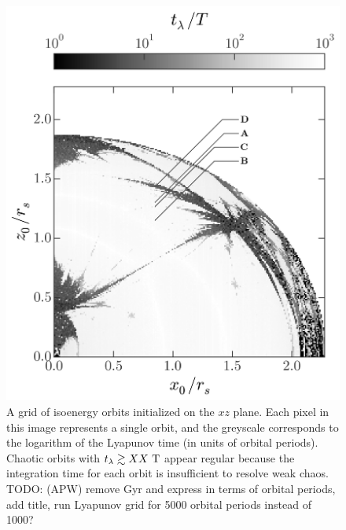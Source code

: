 \documentclass[letterpaper,12pt,preprint]{aastex}
\newcommand{\todo}[2]{{\color{red} TODO: (\MakeUppercase{#1}) #2}}
\begin{document}
\begin{figure}[p]
\begin{center}
\includegraphics[width=\textwidth]{figures/lyap_map.png}
\caption{ A grid of isoenergy orbits initialized on the $xz$ plane. Each pixel in this image represents a single orbit, and the greyscale corresponds to the logarithm of the Lyapunov time (in units of orbital periods). Chaotic orbits with $t_\lambda \gtrsim XX~{\rm T}$ appear regular because the integration time for each orbit is insufficient to resolve weak chaos. \todo{apw}{remove Gyr and express in terms of orbital periods, add title, run Lyapunov grid for 5000 orbital periods instead of 1000?}} \label{fig:lyapmap} 
\end{center}
\end{figure}
\end{document}
